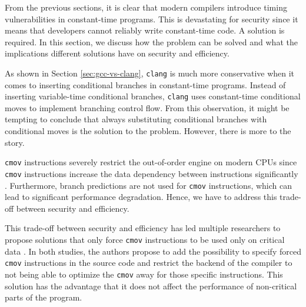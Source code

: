 From the previous sections, it is clear that modern compilers introduce timing vulnerabilities in constant-time programs.
This is devastating for security since it means that developers cannot reliably write constant-time code.
A solution is required.
In this section, we discuss how the problem can be solved and what the implications different solutions have on security and efficiency.

As shown in Section \ref{sec:gcc-vs-clang}, \texttt{clang} is much more conservative when it comes to inserting conditional branches in constant-time programs.
Instead of inserting variable-time conditional branches, \texttt{clang} uses constant-time conditional moves to implement branching control flow.
From this observation, it might be tempting to conclude that always substituting conditional branches with conditional moves is the solution to the problem.
However, there is more to the story.

\texttt{cmov} instructions severely restrict the out-of-order engine on modern CPUs since \texttt{cmov} instructions increase the data dependency between instructions significantly \citep{intel-optimization-reference}. 
Furthermore, branch predictions are not used for \texttt{cmov} instructions, which can lead to significant performance degradation.
Hence, we have to address this trade-off between security and efficiency.

This trade-off between security and efficiency has led multiple researchers to propose solutions that only force \texttt{cmov} instructions to be used only on critical data \citep{what-you-c,llvm-issues-blog-post}.
In both studies, the authors propose to add the possibility to specify forced \texttt{cmov} instructions in the source code and restrict the backend of the compiler to not being able to optimize the \texttt{cmov} away for those specific instructions.
This solution has the advantage that it does not affect the performance of non-critical parts of the program.


